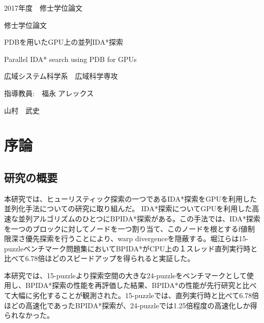 \documentclass[a4paper,11pt,oneside,openany]{jsbook}
\begin{document}
\thispagestyle{empty}
2017年度　修士学位論文%
\bigskip%
\LARGE%
\begin{center}
修士学位論文
\end{center}
\bigskip\bigskip\bigskip\bigskip\bigskip\bigskip\bigskip %
\begin{center} %
PDBを用いたGPU上の並列IDA*探索
\end{center}
\large %
\begin{center}
Parallel IDA* search using PDB for GPUs 
\end{center}
\bigskip\bigskip\bigskip\bigskip\bigskip\bigskip\bigskip\bigskip\bigskip\bigskip
\bigskip\bigskip\bigskip\bigskip\bigskip\bigskip\bigskip\bigskip\bigskip
\Large %
\begin{center}
広域システム科学系　広域科学専攻
\end{center}
\Large %
\begin{center}
指導教員:　福永 アレックス
\end{center}
\LARGE %
\begin{center}
山村　武史
\end{center}
\normalsize
\thispagestyle{empty}
\setcounter{tocdepth}{3}
\tableofcontents

\chapter{序論}
\section{研究の概要}
本研究では、ヒューリスティック探索の一つであるIDA*探索\cite{Kor85}をGPUを利用した並列化手法についての研究に取り組んだ。
IDA*探索についてGPUを利用した高速な並列アルゴリズムのひとつにBPIDA*探索\cite{HA17}がある。この手法では、IDA*探索を一つのブロックに対してノードを一つ割り当て、このノードを根とするf値制限深さ優先探索を行うことにより、warp divergenceを隠蔽する。堀江らは15-puzzleベンチマーク問題集においてBPIDA*がCPU上の１スレッド直列実行時と比べて6.78倍ほどのスピードアップを得られると実証した。

本研究では、15-puzzleより探索空間の大きな24-puzzleをベンチマークとして使用し、BPIDA*探索の性能を再評価した結果、BPIDA*の性能が先行研究と比べて大幅に劣化することが観測された。15-puzzleでは、直列実行時と比べて6.78倍ほどの高速化であったBPIDA*探索が、24-puzzleでは1.25倍程度の高速化しか得られなかった。
\end{document}
